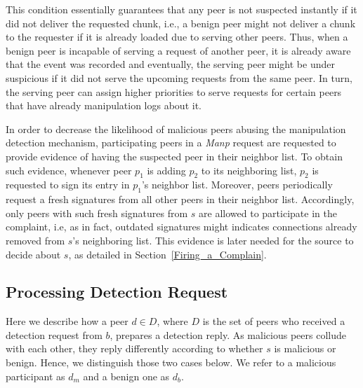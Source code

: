 This condition essentially guarantees that any peer is not suspected instantly if it did not deliver the requested chunk, i.e., a benign peer might not deliver a chunk to the requester if it is already loaded due to serving other peers.
Thus, when a benign peer is incapable of serving a request of another peer, it is already aware that the event was recorded and eventually, the serving peer might be under suspicious if it did not serve the upcoming requests from the same peer.
In turn, the serving peer can assign higher priorities to serve requests for certain peers that have already manipulation logs about it.

In order to decrease the likelihood of malicious peers abusing the manipulation detection mechanism, participating peers in a \textit{Manp} request are requested to provide evidence of having the suspected peer in their neighbor list.
To obtain such evidence, whenever peer $p_1$ is adding $p_2$ to its neighboring list, $p_2$ is requested to sign its entry in $p_1$'s neighbor list.
Moreover, peers periodically request a fresh signatures from all other peers in their neighbor list.
Accordingly, only peers with such fresh signatures from $s$ are allowed to participate in the complaint, i.e, as in fact, outdated signatures might indicates connections already removed from $s$'s neighboring list.
This evidence is later needed for the source to decide about $s$, as detailed in Section~\ref{Firing_a_Complain}.

\subsection{Processing Detection Request}
Here we describe how a peer $d \in D$, where $D$ is the set of peers who received a detection request from $b$, prepares a detection reply.
As malicious peers collude with each other, they reply differently according to whether $s$ is malicious or benign.
Hence, we distinguish those two cases below. We refer to a malicious participant as $d_m$ and a benign one as $d_b$.

